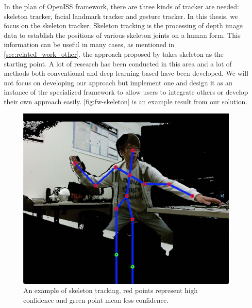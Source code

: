 In the plan of OpenISS framework, there are three kinds of tracker are needed:
skeleton tracker, facial landmark tracker and gesture tracker. In this thesis,
we focus on the skeleton tracker.
Skeleton tracking is the processing of depth image data to establish the
positions of various skeleton joints on a human form. This information can be
useful in many cases, as mentioned in \autoref{sec:related_work_other},
the approach proposed by \cite{rgbd-for-reid} takes skeleton as the starting
point. A lot of research has been conducted in this area and a lot of
methods both conventional and deep learning-based have been developed. We will
not focus on developing our approach but implement one and design it as an
instance of the specialized framework to allow users to integrate others or
develop their own approach easily. \autoref{fig:fw-skeleton} is an example
result from our solution.

\begin{figure}
    \begin{center}
        \includegraphics[scale=0.3]{figures/framework_skeleton.png}
    \end{center}
    \caption[An example of skeleton tracking]
    {An example of skeleton tracking, red points represent high
        confidence and green point mean less confidence.}
    \label{fig:fw-skeleton}
\end{figure}

